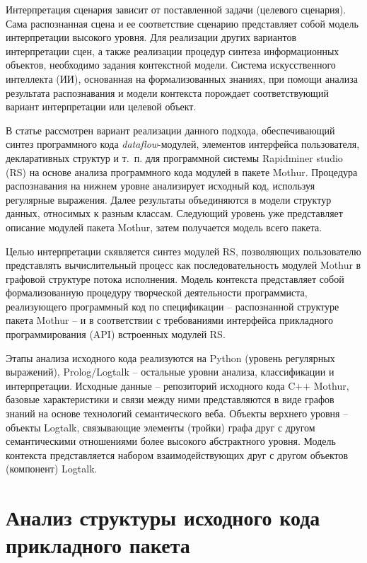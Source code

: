 \documentclass[12pt]{article}
\begin{document}
Интерпретация сценария зависит от поставленной задачи (целевого сценария). Сама распознанная сцена и ее соответствие сценарию представляет собой модель интерпретации высокого уровня. Для реализации других вариантов интерпретации сцен, а также реализации процедур синтеза информационных объектов, необходимо задания контекстной модели. Система искусственного интеллекта (ИИ), основанная на формализованных знаниях, при помощи анализа результата распознавания и модели контекста порождает соответствующий вариант интерпретации или целевой объект.

В статье рассмотрен вариант реализации данного подхода, обеспечивающий синтез программного кода \emph{dataflow}-модулей, элементов интерфейса пользователя, декларативных структур и т.~п. для программной системы Rapidminer studio (RS) на основе анализа программного кода модулей в пакете Mothur. Процедура распознавания на нижнем уровне анализирует исходный код, используя регулярные выражения. Далее результаты объединяются в модели структур данных, относимых к разным классам.  Следующий уровень уже представляет описание модулей пакета Mothur, затем получается модель всего пакета.

Целью интерпретации скявляется синтез модулей RS, позволяющих пользователю представлять вычислительный процесс как последовательность модулей Mothur в графовой структуре потока исполнения. Модель контекста представляет собой формализованную процедуру творческой деятельности программиста, реализующего программный код по спецификации -- распознанной структуре пакета Mothur -- и в соответствии с требованиями интерфейса прикладного программирования (API) встроенных модулей RS.

Этапы анализа исходного кода реализуются на Python (уровень регулярных выражений), Prolog/Logtalk \cite{logtalk} -- остальные уровни анализа, классификации и интерпретации. Исходные данные -- репозиторий исходного кода C++ Mothur, базовые характеристики и связи между ними представляются в виде графов знаний на основе технологий семантического веба. Объекты верхнего уровня -- объекты Logtalk, связывающие элементы (тройки) графа друг с другом семантическими отношениями более высокого абстрактного уровня. Модель контекста представляется набором взаимодействующих друг с другом объектов (компонент) Logtalk.

\section{Анализ структуры исходного кода прикладного пакета}
\end{document}
